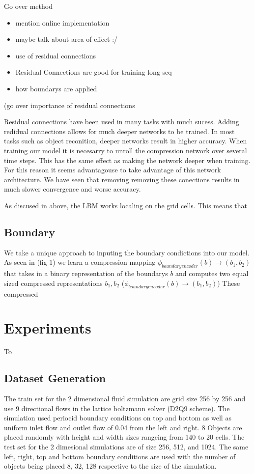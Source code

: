 \documentclass{article}
\begin{document}
Go over method
\begin{itemize}
  \item mention online implementation
  \item maybe talk about area of effect :/
  \item use of residual connections
  \item Residual Connections are good for training long seq
  \item how boundarys are applied
\end{itemize}

(go over importance of residual connections

Residual connections have been used in many tasks with much sucess. Adding redidual connections allows for much deeper networks to be trained. In most tasks such as object reconition, deeper networks result in higher accuracy. When training our model it is necesarry to unroll the compression network over several time steps. This has the same effect as making the network deeper when training. For this reason it seems advantagouse to take advantage of this network architecture. We have seen that removing removing these conections results in much slower convergence and worse accuracy.

As discused in above, the LBM works localing on the grid cells. This means that 

\subsection{Boundary}

We take a unique approach to inputing the boundary condictions into our model. As seen in (fig 1) we learn a compression mapping $\phi_{boundary encoder}(b) \rightarrow (b_1, b_2)$ that takes in a binary representation of the boundarys $b$ and computes two equal sized compressed representations $b_1, b_2$ ($\phi_{boundary encoder}(b) \rightarrow (b_1, b_2)$) These compressed 

\section{Experiments}

To

\subsection{Dataset Generation}

The train set for the 2 dimensional fluid simulation are grid size 256 by 256 and use 9 directional flows in the lattice boltzmann solver (D2Q9 scheme). The simulation used periocid boundary conditions on top and bottom as well as uniform inlet flow and outlet flow of 0.04 from the left and right. 8 Objects are placed randomly with height and width sizes rangeing from 140 to 20 cells. The test set for the 2 dimesional simulations are of size 256, 512, and 1024. The same left, right, top and bottom boundary conditions are used with the number of objects being placed 8, 32, 128 respective to the size of the simulation. 
\end{document}
